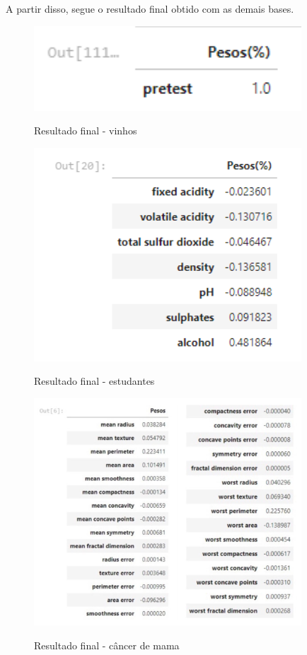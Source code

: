 \documentclass[12pt]{article}
\begin{document}
\vspace{40px}
A partir disso, segue o resultado final obtido com as demais bases. 
\\
\begin{figure}[h]
\caption{Resultado final - vinhos}
\centering
\includegraphics[width=10cm]{out4.png}
\label{figura:out4}
\end{figure}

\begin{figure}[h]
\caption{Resultado final - estudantes}
\centering
\includegraphics[width=10cm]{out3.png}
\label{figura:out3}
\end{figure}

\begin{figure}[h]
\caption{Resultado final - câncer de mama}
\centering
\includegraphics[width=10cm]{out5.jpeg}
\label{figura:out5}
\end{figure}
\end{document}
